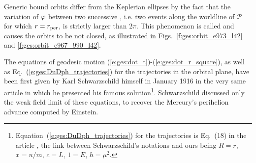 Generic bound orbits differ from the Keplerian ellipses by the fact that
the variation of $\varphi$ between two successive ,
i.e. two events along the worldline of $\mathscr{P}$ for which $r=r_{\rm per}$,
is strictly larger than $2\pi$. This phenomenon is called 
and causes the orbits to be not closed, as illustrated in Figs.~\ref{f:ges:orbit_e973_l42} and
\ref{f:ges:orbit_e967_990_l42}.


\begin{hist} \label{h:ges:geod}
The equations of geodesic motion (\ref{e:ges:dot_t})-(\ref{e:ges:dot_r_square}),
as well as Eq.~(\ref{e:ges:DuDph_trajectories}) for the trajectories in the
orbital plane, have been first given by Karl Schwarzschild
himself in January 1916 in the very same article \cite{Schwa1916} in which he presented
his famous solution\footnote{Equation~(\ref{e:ges:DuDph_trajectories}) for the
trajectories is Eq.~(18) in the article \cite{Schwa1916}, the
link between Schwarzschild's notations and ours being $R=r$, $x=u/m$, $c=L$,
$1=E$, $h=\mu^2$.}. Schwarzschild discussed only the weak field limit of these
equations, to recover the Mercury's perihelion advance computed by
Einstein.


\end{hist}
